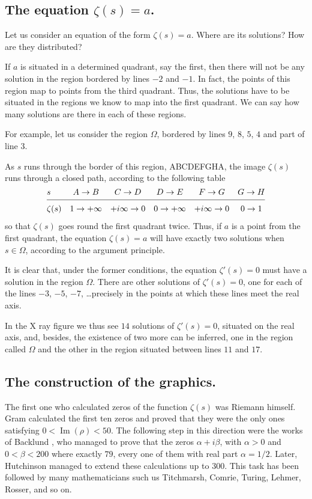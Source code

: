 \documentclass[a4paper]{amsart}
\numberwithin{equation}{section}
\def\Im{\operatorname{\text{Im}}}
\begin{document}
\begin{large}





\subsection{The equation $\zeta(s)=a$.}
Let us consider an equation of the form
$\zeta(s)=a$. Where are its solutions? How are they distributed?

If $a$ is situated in a determined quadrant, say the first, then there will
not be any solution in the region bordered by lines $-2$ and $-1$. In fact, the
points of this region map to points from the third quadrant. Thus, the
solutions have to be situated in the regions we know to map into the first
quadrant. We can say how many solutions are there  in each of these regions.


For example, let us consider the region $\Omega$, bordered by lines $9$, $8$,
$5$, $4$ and part of line $3$.

As $s$ runs through the border of this region, ABCDEFGHA, the image $\zeta(s)$
runs through a closed path, according to the following table
$$\vbox{\halign{#\hfil\quad &\hfil#\hfil\quad& \hfil#\hfil\quad& \hfil#\hfil\quad& 
\hfil#\hfil\quad& \hfil#\hfil\cr
$s$&$A\to B$& $C\to D$& $D\to E$& $F\to G$&$G\to H$\cr
\noalign{\medskip\hrule\medskip}
$\zeta(s)$&$1\to+\infty$&$+i\infty\to0$&$0\to+\infty$&$+i\infty\to0$&$0\to1$\cr}}$$
so that $\zeta(s)$ goes round the first quadrant twice. Thus, if $a$ is a point
from the first quadrant, the equation $\zeta(s)=a$ will have exactly two
solutions when $s\in \Omega$, according to the argument principle.

It is clear that, under the former conditions, the equation 
$\zeta'(s)=0$ must
have a solution in the region $\Omega$. There are other solutions of
$\zeta'(s)= 0$, one for each of the lines $-3$, $-5$, $-7$, \dots precisely in the
points at which these lines meet the real axis.

In the X ray figure we thus see $14$ solutions of $\zeta'(s)=0$, situated on
the real axis, and, besides, the existence of two more can be inferred, one
in the region called $\Omega$ and the other in the region situated between
lines $11$ and $17$.


\subsection{The construction of the graphics.}
The first one who
calculated zeros of the function $\zeta(s)$ was Riemann himself.
Gram \cite{G} calculated the first ten zeros and proved that they were
the only ones satisfying $0< \Im (\rho )<50$. The following step
in this direction were the works of Backlund \cite{Ba}, who managed to
prove that the zeros $\alpha + i\beta$, with $\alpha>0$ and
$0<\beta<200$ where exactly $79$, every one of them with real part
$\alpha=1/2$. Later, Hutchinson \cite{H} managed to extend these
calculations up to $300$. This task has been followed by many
mathematicians such us Titchmarsh, Comrie, Turing, Lehmer, Rosser,
and so on.


\end{large}
\end{document}
